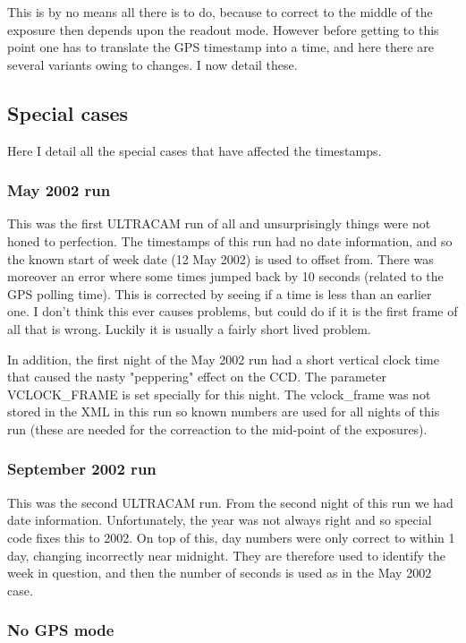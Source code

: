 \documentclass[10pt,a4paper,twocolumn]{article}
\begin{document}
This is by no means all there is to do, because to correct to the
middle of the exposure then depends upon the readout mode. However
before getting to this point one has to translate the GPS timestamp
into a time, and here there are several variants owing to changes. I
now detail these.

\subsection{Special cases}

Here I detail all the special cases that have affected the timestamps.

\subsubsection{May 2002 run}

This was the first ULTRACAM run of all and unsurprisingly things were
not honed to perfection. The timestamps of this run had no date
information, and so the known start of week date (12 May 2002) is used
to offset from. There was moreover an error where some times jumped
back by 10 seconds (related to the GPS polling time). This is
corrected by seeing if a time is less than an earlier one. I don't
think this ever causes problems, but could do if it is the first frame
of all that is wrong. Luckily it is usually a fairly short lived
problem.

In addition, the first night of the May 2002 run had a short vertical
clock time that caused the nasty "peppering" effect on the CCD. The
parameter VCLOCK\_FRAME is set specially for this night. The
vclock\_frame was not stored in the XML in this run so known numbers
are used for all nights of this run (these are needed for the
correaction to the mid-point of the exposures).

\subsubsection{September 2002 run}

This was the second ULTRACAM run. From the second night of this run we
had date information. Unfortunately, the year was not always right and
so special code fixes this to 2002. On top of this, day numbers were
only correct to within 1 day, changing incorrectly near midnight. They
are therefore used to identify the week in question, and then the
number of seconds is used as in the May 2002 case. 

\subsubsection{No GPS mode}
\end{document}
